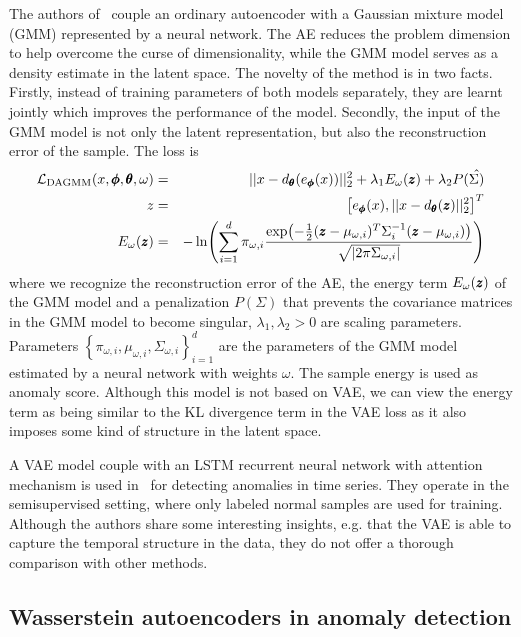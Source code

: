 The authors of~\cite{zong2018deep} couple an ordinary autoencoder
with a Gaussian mixture model (GMM) represented by a neural network.
The AE reduces the problem dimension to help overcome the curse of
dimensionality, while the GMM model serves as a density estimate in
the latent space. The novelty of the method is in two facts. Firstly,
instead of training parameters of both models separately, they are
learnt jointly which improves the performance of the model. Secondly,
the input of the GMM model is not only the latent representation,
but also the reconstruction error of the sample. The loss is 
\begin{eqnarray}
\mathcal{L}_{\text{DAGMM}}(x,\vc{\phi},\vc{\theta},\omega) & = & ||x-d_{\vc{\theta}}(e_{\vc{\phi}}(x))||_{2}^{2}+\lambda_{1}E_{\omega}(\vc{z})+\lambda_{2}P(\hat{\Sigma)}\\
z & = & \left[e_{\vc{\phi}}(x),||x-d_{\vc{\theta}}(\vc{z})||_{2}^{2}\right]^{T}\\
E_{\omega}(\vc{z}) & = & -\ln\left(\sum_{i=1}^{d}\pi_{\omega,i}\frac{\exp\left(-\frac{1}{2}(\vc{z}-\mu_{\omega,i})^{T}\Sigma_{i}^{-1}(\vc{z}-\mu_{\omega,i})\right)}{\sqrt{|2\pi\Sigma_{\omega,i}|}}\right)
\end{eqnarray}
where we recognize the reconstruction error of the AE, the energy
term $E_{\omega}(\pmb{{z}})$ of the GMM model and a penalization $P(\Sigma)$
that prevents the covariance matrices in the GMM model to become singular,
$\lambda_{1},\lambda_{2}>0$ are scaling parameters. Parameters $\left\{ \pi_{\omega,i},\mu_{\omega,i},\Sigma_{\omega,i}\right\} _{i=1}^{d}$
are the parameters of the GMM model estimated by a neural network
with weights $\omega$. The sample energy is used as anomaly score.
Although this model is not based on VAE, we can view the energy term
as being similar to the KL divergence term in the VAE loss as it also
imposes some kind of structure in the latent space.

A VAE model couple with an LSTM recurrent neural network with attention
mechanism is used in~\cite{pereira2018unsupervised} for detecting
anomalies in time series. They operate in the semisupervised setting,
where only labeled normal samples are used for training. Although
the authors share some interesting insights, e.g. that the VAE is
able to capture the temporal structure in the data, they do not offer
a thorough comparison with other methods.




\subsection{Wasserstein autoencoders in anomaly detection}

